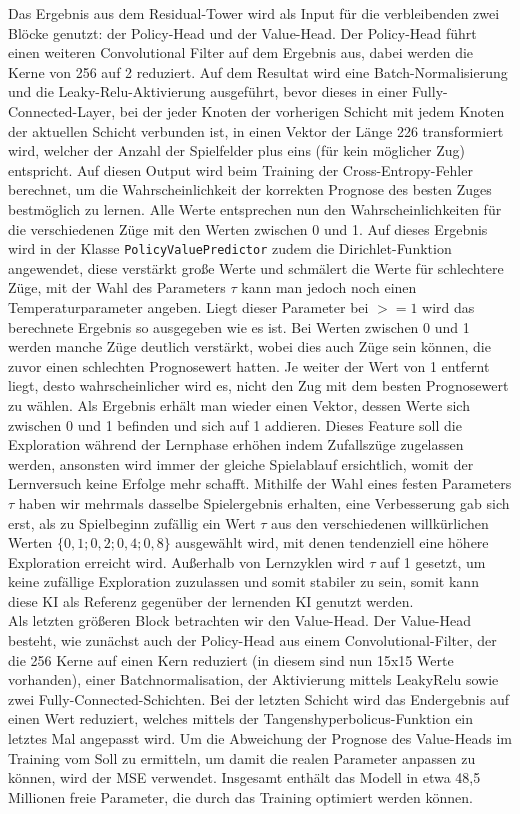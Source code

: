 \documentclass[12pt,a4paper]{article}
\begin{document}
Das Ergebnis aus dem Residual-Tower wird als Input für die verbleibenden zwei Blöcke genutzt: der Policy-Head und der Value-Head. Der Policy-Head führt einen weiteren Convolutional Filter auf dem Ergebnis aus, dabei werden die Kerne von 256 auf 2 reduziert. Auf dem Resultat  wird eine Batch-Normalisierung und die Leaky-Relu-Aktivierung ausgeführt, bevor dieses in einer Fully-Connected-Layer, bei der jeder Knoten der vorherigen Schicht mit jedem Knoten der aktuellen Schicht verbunden ist, in einen Vektor der Länge 226 transformiert wird, welcher der Anzahl der Spielfelder plus eins (für kein möglicher Zug) entspricht. Auf diesen Output wird beim Training der Cross-Entropy-Fehler berechnet, um die Wahrscheinlichkeit der korrekten Prognose des besten Zuges bestmöglich zu lernen. Alle Werte entsprechen nun den Wahrscheinlichkeiten für die verschiedenen Züge mit den Werten zwischen 0 und 1. Auf dieses Ergebnis wird in der Klasse \texttt{PolicyValuePredictor} zudem die Dirichlet-Funktion angewendet, diese verstärkt große Werte und schmälert die Werte für schlechtere Züge, mit der Wahl des Parameters $\tau$ kann man jedoch noch einen Temperaturparameter angeben. Liegt dieser Parameter bei $>= 1$ wird das berechnete Ergebnis so ausgegeben wie es ist. Bei Werten zwischen 0 und 1 werden manche Züge deutlich verstärkt, wobei dies auch Züge sein können, die zuvor einen schlechten Prognosewert hatten. Je weiter der Wert von 1 entfernt liegt, desto wahrscheinlicher wird es, nicht den Zug mit dem besten Prognosewert zu wählen. Als Ergebnis erhält man wieder einen Vektor, dessen Werte sich zwischen 0 und 1 befinden und sich auf 1 addieren. Dieses Feature soll die Exploration während der Lernphase erhöhen indem Zufallszüge zugelassen werden, ansonsten wird immer der gleiche Spielablauf ersichtlich, womit der Lernversuch keine Erfolge mehr schafft. Mithilfe der Wahl eines festen Parameters $\tau$ haben wir mehrmals dasselbe Spielergebnis erhalten, eine Verbesserung gab sich erst, als zu Spielbeginn zufällig ein Wert  $\tau$ aus den verschiedenen willkürlichen Werten $\{0,1; 0,2; 0,4; 0,8\}$ ausgewählt wird, mit denen tendenziell eine höhere Exploration erreicht wird. Außerhalb von Lernzyklen wird $\tau$ auf 1 gesetzt, um keine zufällige Exploration zuzulassen und somit stabiler zu sein, somit kann diese KI als Referenz gegenüber der lernenden KI genutzt werden. \\
Als letzten größeren Block betrachten wir den Value-Head. Der Value-Head besteht, wie zunächst auch der Policy-Head aus einem Convolutional-Filter, der die 256 Kerne auf einen Kern reduziert (in diesem sind nun 15x15 Werte vorhanden), einer Batchnormalisation, der Aktivierung mittels LeakyRelu sowie zwei Fully-Connected-Schichten. Bei der letzten Schicht wird das Endergebnis auf einen Wert reduziert, welches mittels der Tangenshyperbolicus-Funktion ein letztes Mal angepasst wird. Um die Abweichung der Prognose des Value-Heads im Training vom Soll zu ermitteln, um damit die realen Parameter anpassen zu können, wird der MSE verwendet. Insgesamt enthält das Modell in etwa 48,5 Millionen freie Parameter, die durch das Training optimiert werden können.
\end{document}
